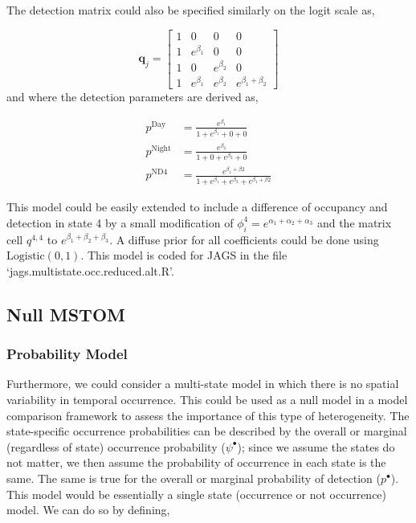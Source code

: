 \documentclass[12pt]{article}
\begin{document}
The detection matrix could also be specified similarly on the logit scale as,

\begin{equation}
\boldsymbol{q}_{j} = \begin{bmatrix} 1 & 0 & 0 & 0 \\ 
									1 & e^{\beta_{1}} & 0 & 0 \\ 
									1 & 0 & e^{\beta_{2}} & 0\\
  								      1 & e^{\beta_{1}} & e^{\beta_{2}} & e^{\beta_{1}+\beta_{2}}  
  								      \end{bmatrix}
\end{equation}
and where the detection parameters are derived as,
\begin{center}
\begin{align*}
p^{\text{Day}} &= \frac{e^{\beta_{1}}}{1+e^{\beta_{1}}+0+0}\\
p^{\text{Night}} &= \frac{e^{\beta_{2}}}{1+0+e^{\beta_{2}}+0}\\
 p^{\text{ND4}} &= \frac{e^{\beta_{1}+\beta{2}}}{1+e^{\beta_{1}}+e^{\beta_{2}}+e^{\beta_{1}+\beta{2}}}
\end{align*}
\end{center}

This model could be easily extended to include a difference of occupancy and detection in state 4 by a small modification of $\phi^4_{i} = e^{\alpha_{1}+\alpha_{2}+\alpha_{3}}$ and the matrix cell $q^{4,4}$ to $e^{\beta_{1}+\beta_{2}+\beta_{3}} $. A diffuse prior for all coefficients could be done using $\text{Logistic}(0,1).$ This model is coded for JAGS in the file `jags.multistate.occ.reduced.alt.R'.\\

\subsection{Null MSTOM}
\subsubsection{Probability Model}
Furthermore, we could consider a multi-state model in which there is no spatial variability in temporal occurrence. This could be used as a null model in a model comparison framework to assess the importance of this type of heterogeneity. The state-specific occurrence probabilities can be described by the overall or marginal (regardless of state) occurrence probability ($\psi^{\bullet}$); since we assume the states do not matter, we then assume the probability of occurrence in each state is the same. The same is true for the overall or marginal probability of detection ($p^{\bullet}$). This model would be essentially a single state (occurrence or not occurrence) model. We can do so by defining, 
\end{document}
